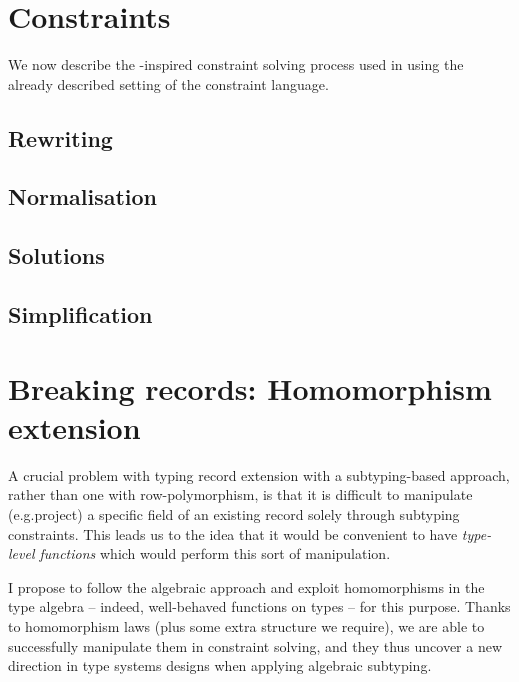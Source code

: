 \section{Constraints}
\label{sec:constraints}

We now describe the \mlstruct{}-inspired constraint solving process used in \inference{} using the already described setting of the constraint language.

\subsection{Rewriting}
\label{subsec:rewriting}

\subsection{Normalisation}
\label{subsec:normalisation}

\subsection{Solutions}
\label{subsec:solutions}

\subsection{Simplification}
\label{subsec:simplification}

\section{Breaking records: Homomorphism extension}
\label{sec:breaking-records}

A crucial problem with typing record extension with a subtyping-based approach, rather than one with row-polymorphism, is that it is difficult to manipulate (e.g.\@ project) a specific field of an existing record solely through subtyping constraints. This leads us to the idea that it would be convenient to have \emph{type-level functions} which would perform this sort of manipulation. 

I propose to follow the algebraic approach and exploit homomorphisms in the type algebra -- indeed, well-behaved functions on types -- for this purpose. Thanks to homomorphism laws (plus some extra structure we require), we are able to successfully manipulate them in constraint solving, and they thus uncover a new direction in type systems designs when applying algebraic subtyping.

